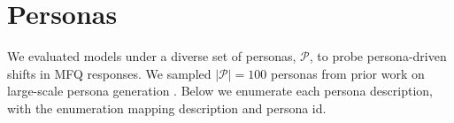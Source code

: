 \documentclass{article}
\begin{document}
\section{Personas}
\label{app:personas}
We evaluated models under a diverse set of personas, $\mathcal{P}$, to probe persona-driven shifts in MFQ responses. We sampled $|\mathcal{P}|=100$ personas from prior work on large-scale persona generation \citep{ge2025scalingsyntheticdatacreation}. Below we enumerate each persona description, with the enumeration mapping description and persona id.

\end{document}
